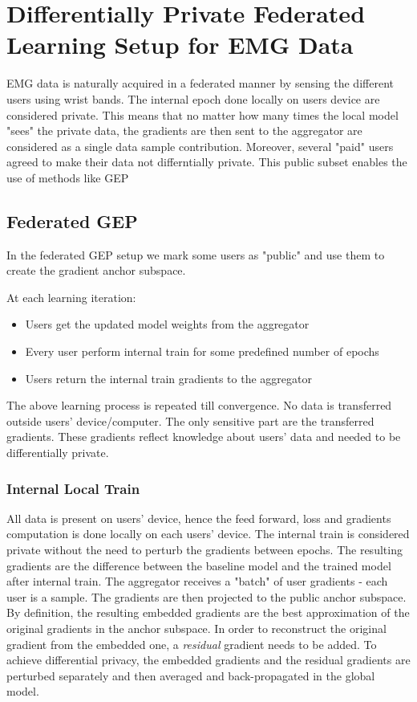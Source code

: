 \documentclass[fourier]{_style/dissertation}
\begin{document}
\section{Differentially Private Federated Learning  Setup for EMG Data }
EMG data is naturally acquired in a federated manner by sensing the different users using wrist bands. The internal epoch done locally on users device are considered private. This means that no matter how many times the local model "sees" the private data, the gradients are then sent to the aggregator are considered as a single data sample contribution. Moreover, several "paid" users agreed to make their data not differntially private. This public subset enables the use of methods like GEP \cite{Yu2021DoLearning} 
\subsection{Federated GEP}
In the federated GEP setup we mark some users as "public" and use them to create the gradient anchor subspace. 

At each learning iteration:
\begin{itemize}
    \item Users get the updated model weights from the aggregator
    \item Every user perform internal train for some predefined number of epochs
    \item Users return the internal train gradients to the aggregator
\end{itemize}
 The above learning process is repeated till convergence. No data is transferred outside users' device/computer. The only sensitive part are the transferred gradients. These gradients reflect knowledge about users' data and needed to be differentially private.
 \subsubsection{Internal Local Train}
 All data is present on users' device, hence the feed forward, loss and gradients computation is done locally on each users' device.
 The internal train is considered private without the need to perturb the gradients between epochs. The resulting gradients are the difference between the baseline model and the trained model after internal train. The aggregator receives a "batch" of user gradients - each user is a sample. The gradients are then projected to the public anchor subspace. By definition, the resulting embedded gradients are the best approximation of the original gradients in the anchor subspace. In order to reconstruct the original gradient from the embedded one, a \textit{residual} gradient needs to be added. To achieve differential privacy, the embedded gradients and the residual gradients are perturbed separately and then averaged and back-propagated in the global model.
\end{document}
